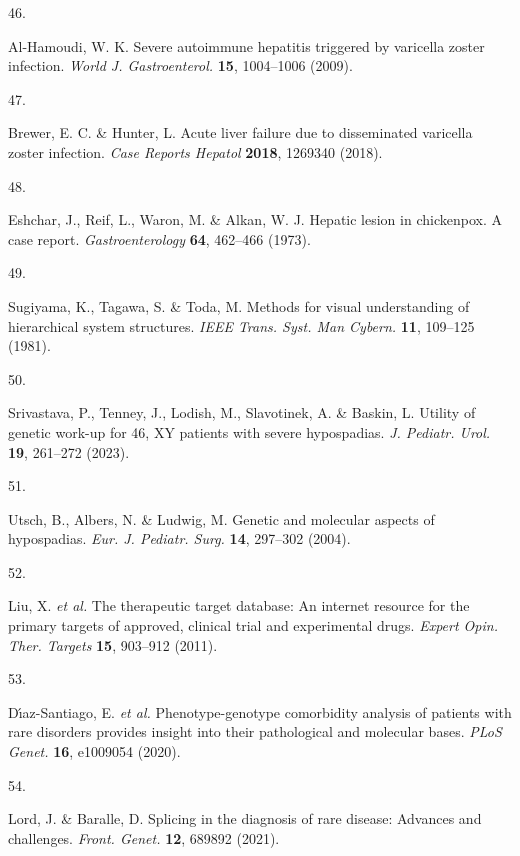\documentclass[
sn-nature
]{sn-jnl}
\newlength{\cslhangindent}
\newlength{\csllabelwidth}
\newenvironment{CSLReferences}[2] %
 {\begin{list}{}{%
  \setlength{\itemindent}{0pt}
  \setlength{\leftmargin}{0pt}
  \setlength{\parsep}{0pt}
  \ifodd #1
   \setlength{\leftmargin}{\cslhangindent}
   \setlength{\itemindent}{-1\cslhangindent}
  \fi
  \setlength{\itemsep}{#2\baselineskip}}}
 {\end{list}}
\newcommand{\CSLLeftMargin}[1]{\parbox[t]{\csllabelwidth}{\strut#1\strut}}
\newcommand{\CSLRightInline}[1]{\parbox[t]{\linewidth - \csllabelwidth}{\strut#1\strut}}
\begin{document}
\begin{CSLReferences}{0}{0}
\CSLLeftMargin{46. }%
\CSLRightInline{Al-Hamoudi, W. K. Severe autoimmune hepatitis triggered
by varicella zoster infection. \emph{World J. Gastroenterol.}
\textbf{15}, 1004--1006 (2009).}

\CSLLeftMargin{47. }%
\CSLRightInline{Brewer, E. C. \& Hunter, L. Acute liver failure due to
disseminated varicella zoster infection. \emph{Case Reports Hepatol}
\textbf{2018}, 1269340 (2018).}

\CSLLeftMargin{48. }%
\CSLRightInline{Eshchar, J., Reif, L., Waron, M. \& Alkan, W. J. Hepatic
lesion in chickenpox. A case report. \emph{Gastroenterology}
\textbf{64}, 462--466 (1973).}

\CSLLeftMargin{49. }%
\CSLRightInline{Sugiyama, K., Tagawa, S. \& Toda, M. Methods for visual
understanding of hierarchical system structures. \emph{IEEE Trans. Syst.
Man Cybern.} \textbf{11}, 109--125 (1981).}

\CSLLeftMargin{50. }%
\CSLRightInline{Srivastava, P., Tenney, J., Lodish, M., Slavotinek, A.
\& Baskin, L. Utility of genetic work-up for 46, {XY} patients with
severe hypospadias. \emph{J. Pediatr. Urol.} \textbf{19}, 261--272
(2023).}

\CSLLeftMargin{51. }%
\CSLRightInline{Utsch, B., Albers, N. \& Ludwig, M. Genetic and
molecular aspects of hypospadias. \emph{Eur. J. Pediatr. Surg.}
\textbf{14}, 297--302 (2004).}

\CSLLeftMargin{52. }%
\CSLRightInline{Liu, X. \emph{et al.} The therapeutic target database:
An internet resource for the primary targets of approved, clinical trial
and experimental drugs. \emph{Expert Opin. Ther. Targets} \textbf{15},
903--912 (2011).}

\CSLLeftMargin{53. }%
\CSLRightInline{Dı́az-Santiago, E. \emph{et al.} Phenotype-genotype
comorbidity analysis of patients with rare disorders provides insight
into their pathological and molecular bases. \emph{PLoS Genet.}
\textbf{16}, e1009054 (2020).}

\CSLLeftMargin{54. }%
\CSLRightInline{Lord, J. \& Baralle, D. Splicing in the diagnosis of
rare disease: Advances and challenges. \emph{Front. Genet.} \textbf{12},
689892 (2021).}


\end{CSLReferences}
\end{document}
